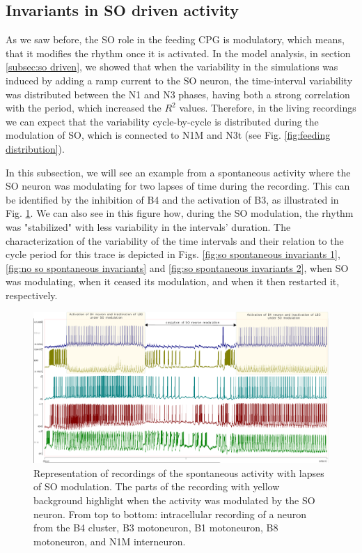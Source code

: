 \clearpage
\newpage
\subsection{Invariants in SO driven activity}
As we saw before, the SO role in the feeding CPG is modulatory, which means, that it modifies the rhythm once it is activated. In the model analysis, in section \ref{subsec:so driven}, we showed that when the variability in the simulations was induced by adding a ramp current to the SO neuron, the time-interval variability was distributed between the N1 and N3 phases, having both a strong correlation with the period, which increased the $R^2$ values. Therefore, in the living recordings we can expect that the variability cycle-by-cycle is distributed during the modulation of SO, which is connected to N1M and N3t (see Fig. \ref{fig:feeding distribution}). 

In this subsection, we will see an example from a spontaneous activity where the SO neuron was modulating for two lapses of time during the recording. This can be identified by the inhibition of B4 and the activation of B3, as illustrated in Fig. \ref{fig:SO-spontaneous-driven}. We can also see in this figure how, during the SO modulation, the rhythm was "stabilized" with less variability in the intervals' duration. The characterization of the variability of the time intervals and their relation to the cycle period for this trace is depicted in Figs. \ref{fig:so spontaneous invariants 1},\ref{fig:no so spontaneous invariants} and \ref{fig:so spontaneous invariants 2}, when SO was modulating, when it ceased its modulation, and when it then restarted it, respectively. 


 \begin{figure}[htbp]
 	\centering
 	\includegraphics[width=\textwidth]{./img/invariants/SO-spontaneuous-driven.pdf}
 	\caption{Representation of recordings of the spontaneous activity with lapses of SO modulation. The parts of the recording with yellow background highlight when the activity was modulated by the SO neuron. From top to bottom: intracellular recording of a neuron from the B4 cluster, B3 motoneuron, B1 motoneuron, B8 motoneuron, and N1M interneuron.}
 	\label{fig:SO-spontaneous-driven}
 \end{figure}

